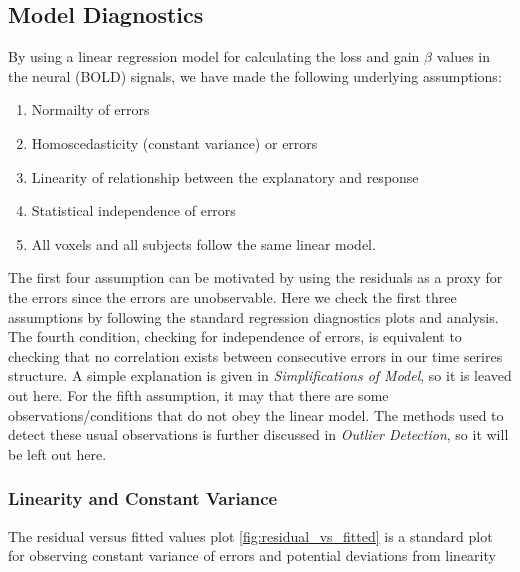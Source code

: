 \subsection{Model Diagnostics}
By using a linear regression model for calculating the loss and gain $\beta $ 
values in the neural (BOLD) signals, we have made the following underlying 
assumptions:
\begin{enumerate}
    \item Normailty of errors
    \item Homoscedasticity (constant variance) or errors  
    \item Linearity of relationship between the explanatory and response
    \item Statistical independence of errors   
    \item All voxels and all subjects follow the same linear model. 
\end{enumerate}
The first four assumption can be motivated by using the residuals as a proxy
for the errors since the errors are unobservable. Here we check the first 
three assumptions by following the standard regression diagnostics plots and 
analysis. The fourth condition, checking for independence of errors, is 
equivalent to checking that no correlation exists between consecutive errors 
in our time serires structure. A simple explanation is given in 
\textit{Simplifications of Model}, so it is leaved out here. For the fifth 
assumption, it may that there are some observations/conditions that do not 
obey the linear model. The methods used to detect these usual observations is 
further discussed in \textit{Outlier Detection}, so it will be left out here. 

\subsubsection{Linearity and Constant Variance}
The residual versus fitted values plot \ref{fig:residual_vs_fitted} is a 
standard plot for observing constant variance of errors and potential deviations
from linearity

